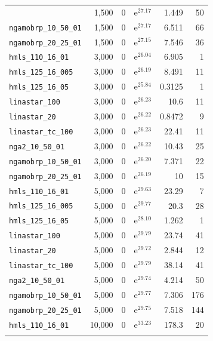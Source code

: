 \begin{longtable}{|l|r|r|r|r|r|}
{    \texttt{nga2\_10\_50\_01} & 1,500 & 0 & $\mathrm{e}^{27.17}$ & 1.449 & 50 \\
    \texttt{ngamobrp\_10\_50\_01} & 1,500 & 0 & $\mathrm{e}^{27.17}$ & 6.511 & 66 \\
    \texttt{ngamobrp\_20\_25\_01} & 1,500 & 0 & $\mathrm{e}^{27.15}$ & 7.546 & 36 \\
    \texttt{hmls\_110\_16\_01} & 3,000 & 0 & $\mathrm{e}^{26.04}$ & 6.905 & 1 \\
    \texttt{hmls\_125\_16\_005} & 3,000 & 0 & $\mathrm{e}^{26.19}$ & 8.491 & 11 \\
    \texttt{hmls\_125\_16\_05} & 3,000 & 0 & $\mathrm{e}^{25.84}$ & 0.3125 & 1 \\
    \texttt{linastar\_100} & 3,000 & 0 & $\mathrm{e}^{26.23}$ & 10.6 & 11 \\
    \texttt{linastar\_20} & 3,000 & 0 & $\mathrm{e}^{26.22}$ & 0.8472 & 9 \\
    \texttt{linastar\_tc\_100} & 3,000 & 0 & $\mathrm{e}^{26.23}$ & 22.41 & 11 \\
    \texttt{nga2\_10\_50\_01} & 3,000 & 0 & $\mathrm{e}^{26.22}$ & 10.43 & 25 \\
    \texttt{ngamobrp\_10\_50\_01} & 3,000 & 0 & $\mathrm{e}^{26.20}$ & 7.371 & 22 \\
    \texttt{ngamobrp\_20\_25\_01} & 3,000 & 0 & $\mathrm{e}^{26.19}$ & 10 & 15 \\
    \texttt{hmls\_110\_16\_01} & 5,000 & 0 & $\mathrm{e}^{29.63}$ & 23.29 & 7 \\
    \texttt{hmls\_125\_16\_005} & 5,000 & 0 & $\mathrm{e}^{29.77}$ & 20.3 & 28 \\
    \texttt{hmls\_125\_16\_05} & 5,000 & 0 & $\mathrm{e}^{28.10}$ & 1.262 & 1 \\
    \texttt{linastar\_100} & 5,000 & 0 & $\mathrm{e}^{29.79}$ & 23.74 & 41 \\
    \texttt{linastar\_20} & 5,000 & 0 & $\mathrm{e}^{29.72}$ & 2.844 & 12 \\
    \texttt{linastar\_tc\_100} & 5,000 & 0 & $\mathrm{e}^{29.79}$ & 38.14 & 41 \\
    \texttt{nga2\_10\_50\_01} & 5,000 & 0 & $\mathrm{e}^{29.74}$ & 4.214 & 50 \\
    \texttt{ngamobrp\_10\_50\_01} & 5,000 & 0 & $\mathrm{e}^{29.77}$ & 7.306 & 176 \\
    \texttt{ngamobrp\_20\_25\_01} & 5,000 & 0 & $\mathrm{e}^{29.75}$ & 7.518 & 144 \\
    \texttt{hmls\_110\_16\_01} & 10,000 & 0 & $\mathrm{e}^{33.23}$ & 178.3 & 20 \\
}
\end{longtable}
